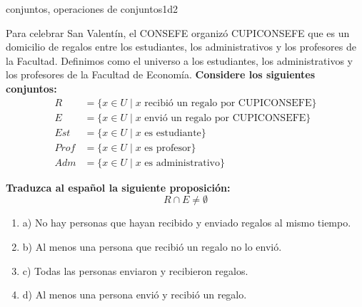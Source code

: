 \documentclass{article}
\begin{document}
\begin{question}{15}{conjuntos, operaciones de conjuntos}{1}{d}{2}{
Para celebrar San Valentín, el CONSEFE organizó CUPICONSEFE que es un domicilio de regalos entre los estudiantes, los administrativos y los profesores de la Facultad. Definimos como el universo a los estudiantes, los administrativos y los profesores de la Facultad de Economía. \textbf{Considere los siguientes conjuntos:}
\[
\begin{aligned}
R &= \{x \in U \mid x \text{ recibió un regalo por CUPICONSEFE}\}\\
E &= \{x \in U \mid x \text{ envió un regalo por CUPICONSEFE}\}\\
Est &= \{x \in U \mid x \text{ es estudiante}\}\\
Prof &= \{x \in U \mid x \text{ es profesor}\}\\
Adm &= \{x \in U \mid x \text{ es administrativo}\}
\end{aligned}
\]

\textbf{Traduzca al español la siguiente proposición:}
\[
R \cap E \neq \emptyset
\]

\begin{enumerate}
    \item a) No hay personas que hayan recibido y enviado regalos al mismo tiempo.
    \item b) Al menos una persona que recibió un regalo no lo envió.
    \item c) Todas las personas enviaron y recibieron regalos.
    \item d) Al menos una persona envió y recibió un regalo.
\end{enumerate}
}
\end{question}
\end{document}
